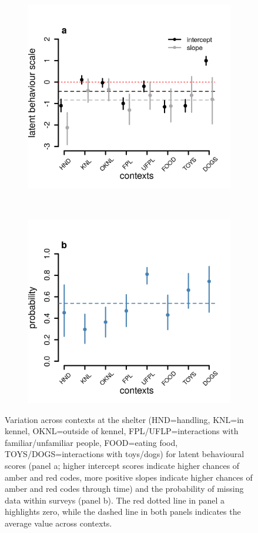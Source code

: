 \documentclass[12pt]{article}
\begin{document}
\newpage
\begin{figure}[]
  \centering
  \begin{subfigure}{0.5\textwidth}
    \includegraphics[scale=0.6]{figures/figure_S1_a}
  \end{subfigure}%
  ~
  \begin{subfigure}{0.5\textwidth}
    \includegraphics[scale=0.6]{figures/figure_S1_b}
  \end{subfigure}%
\caption{Variation across contexts at the shelter  (HND=handling, KNL=in kennel, OKNL=outside of kennel, FPL/UFLP=interactions with familiar/unfamiliar people, FOOD=eating food, TOYS/DOGS=interactions with toys/dogs) for latent behavioural scores (panel a; higher intercept scores indicate higher chances of amber and red codes, more positive slopes indicate higher chances of amber and red codes through time) and the probability of missing data within surveys (panel b). The red dotted line in panel a highlights zero, while the dashed line in both panels indicates the average value across contexts.
}
\label{fig_1}
\end{figure}
\end{document}
